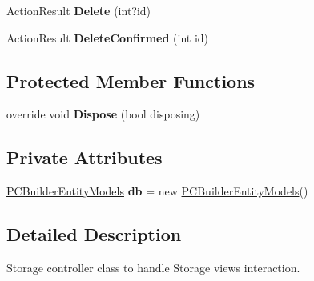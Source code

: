 \begin{DoxyCompactItemize}
\item 
Action\+Result {\bfseries Delete} (int?id)\hypertarget{class_p_c_builder_m_v_c_1_1_controllers_1_1_storage_controller_a61ceedb8611f731f1ce504a3eef2501c}{}\label{class_p_c_builder_m_v_c_1_1_controllers_1_1_storage_controller_a61ceedb8611f731f1ce504a3eef2501c}

\item 
Action\+Result {\bfseries Delete\+Confirmed} (int id)\hypertarget{class_p_c_builder_m_v_c_1_1_controllers_1_1_storage_controller_a18152d71e23f19834e73f8cc958a6f57}{}\label{class_p_c_builder_m_v_c_1_1_controllers_1_1_storage_controller_a18152d71e23f19834e73f8cc958a6f57}

\end{DoxyCompactItemize}
\subsection*{Protected Member Functions}
\begin{DoxyCompactItemize}
\item 
override void {\bfseries Dispose} (bool disposing)\hypertarget{class_p_c_builder_m_v_c_1_1_controllers_1_1_storage_controller_a0c273911b28a7a4d9368775d9a7cc007}{}\label{class_p_c_builder_m_v_c_1_1_controllers_1_1_storage_controller_a0c273911b28a7a4d9368775d9a7cc007}

\end{DoxyCompactItemize}
\subsection*{Private Attributes}
\begin{DoxyCompactItemize}
\item 
\hyperlink{class_p_c_builder_m_v_c_1_1_models_1_1_p_c_builder_entity_models}{P\+C\+Builder\+Entity\+Models} {\bfseries db} = new \hyperlink{class_p_c_builder_m_v_c_1_1_models_1_1_p_c_builder_entity_models}{P\+C\+Builder\+Entity\+Models}()\hypertarget{class_p_c_builder_m_v_c_1_1_controllers_1_1_storage_controller_a446bccc2eff7a3c754f90e65b5aecde9}{}\label{class_p_c_builder_m_v_c_1_1_controllers_1_1_storage_controller_a446bccc2eff7a3c754f90e65b5aecde9}

\end{DoxyCompactItemize}


\subsection{Detailed Description}
Storage controller class to handle Storage views interaction. 

